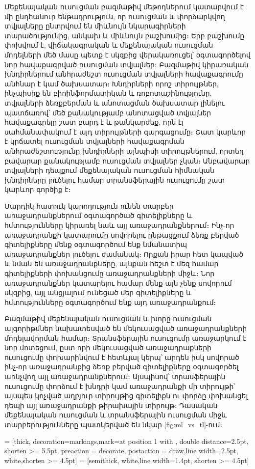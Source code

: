 \documentclass[12pt]{article}
\begin{document}
Մեքենայական ուսուցման բազմաթիվ մեթոդներում կատարվում է մի ընդհանուր ենթադրություն, որ ուսուցման և փորձարկվող տվյալները ընտրվում են միևնույն նկարագիրների տարածությունից,  անկախ և միևնույն բաշխումից։ Երբ բաշխումը փոխվում է, վիճակագրական և մեքենայական ուսուցման մոդելների մեծ մասը պետք է սկզբից վերակառուցել՝ օգտագործելով նոր հավաքագրված ուսուցման տվյալներ։ Բազմաթիվ կիրառական խնդիրներում անհրաժեշտ  ուսուցման տվյալների հավաքագրումը  անհնար է կամ ծախսատար։   Խնդիրների որոշ տիրույթներ, ինչպիսիք են բիոինֆորմատիկան և ռոբոտաշինությունը, տվյալների ձեռքբերման և անոտացման ծախսատար լինելու պատճառով՝  մեծ քանակությամբ անոտացված տվյալներ հավաքագրելը  շատ բարդ է և թանկարժեք, որն էլ սահմանափակում է այդ տիրույթների զարգացումը։ Շատ կարևոր է կրճատել ուսուցման տվյալների   հավաքագրման անհրաժեշտությունը խնդիրների այնպիսի տիրույթներում, որտեղ բավարար քանակությամբ ուսուցման տվյալներ չկան։ Անբավարար տվյալների դեպքում մեքենայական ուսուցման  հիմնական խնդիրները լուծելու համար տրանսֆերային ուսուցումը  շատ կարևոր գործիք է։ \par Մարդիկ հատուկ կարողություն ունեն տարբեր առաջադրանքներում օգտագործած գիտելիքները և հմտությունները կիրառել  նաև այլ առաջադրանքներում։ Ինչ-որ առաջադրանքի կատարումը սովորելու ընթացքում ձեռք բերված գիտելիքները մենք օգտագործում ենք նմանատիպ առաջադրանքներ լուծելու ժամանակ։  Որքան իրար հետ կապված և նման են առաջադրանքները, այնքան հեշտ է մեզ համար  գիտելիքների փոխանցումը առաջադրանքների միջև։ Նոր առաջադրանքներ կատարելու համար մենք այն չենք սովորում սկզբից, այլ անցյալում ունեցած մեր գիտելիքները և հմտությունները օգտագործում ենք այդ առաջադրանքում։

 \par Բազմաթիվ մեքենայական ուսուցման և խորը ուսուցման ալգորիթմներ նախատեսված են մեկուսացված առաջադրանքների մոդելավորման համար։  Տրանսֆերային ուսուցումը առաջարկում է նոր մոտեցում, ըստ որի մեկուսացված առաջադրաքների ուսուցումը փոխարինվում է հետևյալ կերպ՝ արդեն իսկ սովորած ինչ-որ առաջադրանքից ձեռք բերված գիտելիքները օգտագործել առնչվող այլ  առաջադրանքներում։  Այսպիսով՝ տրասֆերային ուսուցումը փորձում է խնդրի  կամ առաջադրանքի մի տիրույթի՝ այսպես կոչված աղբյուր տիրույթից գիտելիքն ու փորձը փոխանցել դեպի այլ  առաջադրանքի թիրախային տիրույթ։ Դասական մեքենայական ուսուցման և տրանսֆերային ուսուցման միջև տարբերությունները պատկերված են նկար \ref{fig:ml_vs_tl}-ում։


 = [thick, decoration={markings,mark=at position
   1 with {}},
   double distance=2.5pt, shorten >= 5.5pt,
   preaction = {decorate},
   postaction = {draw,line width=2.5pt, white,shorten >= 4.5pt}]
 = [semithick, white,line width=1.4pt, shorten >= 4.5pt]
\end{document}
